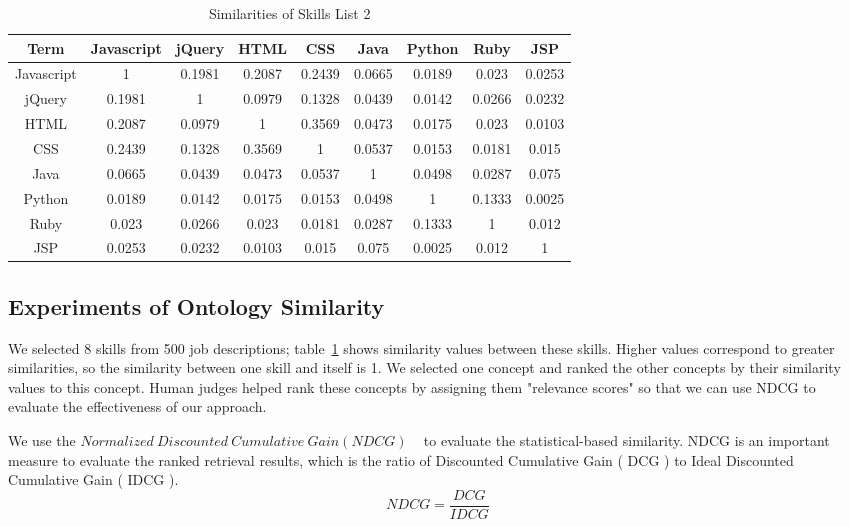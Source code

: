 \begin{table}

\caption{Similarities of Skills List 2}
\begin{tabular}{ c | c c c c c c c c }
 \hline
  Term       & Javascript & jQuery &  HTML  &  CSS   &  Java  & Python &  Ruby  &  JSP    \\  \hline
  Javascript &     1      & 0.1981 & 0.2087 & 0.2439 & 0.0665 & 0.0189 & 0.023  & 0.0253   \\
    jQuery   &   0.1981   &   1    & 0.0979 & 0.1328 & 0.0439 & 0.0142 & 0.0266 & 0.0232    \\
     HTML    &   0.2087   & 0.0979 &   1    & 0.3569 & 0.0473 & 0.0175 & 0.023  & 0.0103   \\
     CSS     &   0.2439   & 0.1328 & 0.3569 &   1    & 0.0537 & 0.0153 & 0.0181 & 0.015    \\
     Java    &   0.0665   & 0.0439 & 0.0473 & 0.0537 &   1    & 0.0498 & 0.0287 & 0.075    \\
    Python   &   0.0189   & 0.0142 & 0.0175 & 0.0153 & 0.0498 &   1    & 0.1333 & 0.0025   \\
     Ruby    &   0.023    & 0.0266 & 0.023  & 0.0181 & 0.0287 & 0.1333 &   1    & 0.012    \\
     JSP     &   0.0253   & 0.0232 & 0.0103 & 0.015  & 0.075  & 0.0025 & 0.012  &   1      \\
 \hline
\end{tabular}
\label{tab:dismatrix2}
\end{table}


\subsection{Experiments of Ontology Similarity}

We selected 8 skills from 500 job descriptions; table~\ref{tab:dismatrix2} shows similarity values between these skills. Higher values correspond to greater similarities, so the similarity between one skill and itself is 1. We selected one concept and ranked the other concepts by their similarity values to this concept. Human judges helped rank these concepts by assigning them "relevance scores" so that we can use NDCG to evaluate the effectiveness of our approach.

We use the $ Normalized~Discounted~Cumulative~Gain ( NDCG )$ ~\cite{manning2008introduction} to evaluate the statistical-based similarity. NDCG is an important measure to evaluate the ranked retrieval results, which is the ratio of  Discounted Cumulative Gain ( DCG ) to Ideal Discounted Cumulative Gain ( IDCG ).
 $$ NDCG = \frac {DCG}{IDCG} $$

